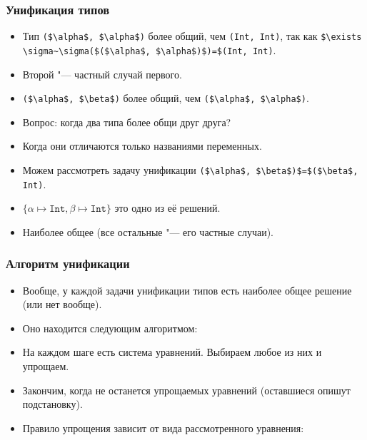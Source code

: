 \documentclass[11pt]{beamer}
\begin{document}
\begin{frame}[fragile]
\frametitle{Унификация типов}
\begin{itemize}
    \item Тип \lstinline[mathescape]|($\alpha$, $\alpha$)| более общий, чем \lstinline[mathescape]|(Int, Int)|, так как  \lstinline[mathescape]|$\exists \sigma~\sigma($($\alpha$, $\alpha$)$)=$(Int, Int)|.
    \item Второй "--- частный случай первого.
    \pause
    \item \lstinline[mathescape]|($\alpha$, $\beta$)| более общий, чем \lstinline[mathescape]|($\alpha$, $\alpha$)|.
    \pause
    \item Вопрос: когда два типа более общи друг друга?
    \pause
    \item Когда они отличаются только названиями переменных.
    \pause
    \item Можем рассмотреть задачу унификации \lstinline[mathescape]|($\alpha$, $\beta$)$=$($\beta$, Int)|.
    \pause
    \item $\{ \alpha \mapsto \mathtt{Int}, \beta \mapsto \mathtt{Int} \}$ это одно из её решений.
    \pause
    \item Наиболее общее (все остальные "--- его частные случаи).
\end{itemize}
\end{frame}

\begin{frame}[fragile]
\frametitle{Алгоритм унификации}
\begin{itemize}
    \item Вообще, у каждой задачи унификации типов есть наиболее общее решение (или нет вообще). 
    \item Оно находится следующим алгоритмом:
    \pause
    \item На каждом шаге есть система уравнений. Выбираем любое из них и упрощаем.
    \item Закончим, когда не останется упрощаемых уравнений (оставшиеся опишут подстановку).
    \item Правило упрощения зависит от вида рассмотренного уравнения:
\end{itemize}
\end{frame}
\end{document}
